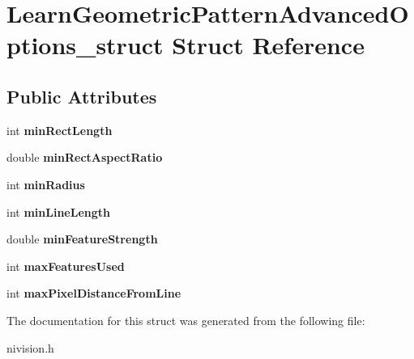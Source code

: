 \hypertarget{structLearnGeometricPatternAdvancedOptions__struct}{\section{\-Learn\-Geometric\-Pattern\-Advanced\-Options\-\_\-struct \-Struct \-Reference}
\label{structLearnGeometricPatternAdvancedOptions__struct}
}
\subsection*{\-Public \-Attributes}
\begin{DoxyCompactItemize}
\item 
\hypertarget{structLearnGeometricPatternAdvancedOptions__struct_a4a205923a89132ff0d1ddb23e5fc81cb}{int {\bfseries min\-Rect\-Length}}\label{structLearnGeometricPatternAdvancedOptions__struct_a4a205923a89132ff0d1ddb23e5fc81cb}

\item 
\hypertarget{structLearnGeometricPatternAdvancedOptions__struct_a36f89f85b3efb21e2b83471f4bdecb9c}{double {\bfseries min\-Rect\-Aspect\-Ratio}}\label{structLearnGeometricPatternAdvancedOptions__struct_a36f89f85b3efb21e2b83471f4bdecb9c}

\item 
\hypertarget{structLearnGeometricPatternAdvancedOptions__struct_a576fc2b10d00707c1c7b326ade74d152}{int {\bfseries min\-Radius}}\label{structLearnGeometricPatternAdvancedOptions__struct_a576fc2b10d00707c1c7b326ade74d152}

\item 
\hypertarget{structLearnGeometricPatternAdvancedOptions__struct_ad638184835077c0d1b7abbae21b1cd5d}{int {\bfseries min\-Line\-Length}}\label{structLearnGeometricPatternAdvancedOptions__struct_ad638184835077c0d1b7abbae21b1cd5d}

\item 
\hypertarget{structLearnGeometricPatternAdvancedOptions__struct_a2faeca0343c8f44311025f617d3ffa11}{double {\bfseries min\-Feature\-Strength}}\label{structLearnGeometricPatternAdvancedOptions__struct_a2faeca0343c8f44311025f617d3ffa11}

\item 
\hypertarget{structLearnGeometricPatternAdvancedOptions__struct_a1c5ab25ab5536056703f20c706fca235}{int {\bfseries max\-Features\-Used}}\label{structLearnGeometricPatternAdvancedOptions__struct_a1c5ab25ab5536056703f20c706fca235}

\item 
\hypertarget{structLearnGeometricPatternAdvancedOptions__struct_a5a2150d8c00370109cf36a5c13b047df}{int {\bfseries max\-Pixel\-Distance\-From\-Line}}\label{structLearnGeometricPatternAdvancedOptions__struct_a5a2150d8c00370109cf36a5c13b047df}

\end{DoxyCompactItemize}


\-The documentation for this struct was generated from the following file\-:\begin{DoxyCompactItemize}
\item 
nivision.\-h\end{DoxyCompactItemize}
